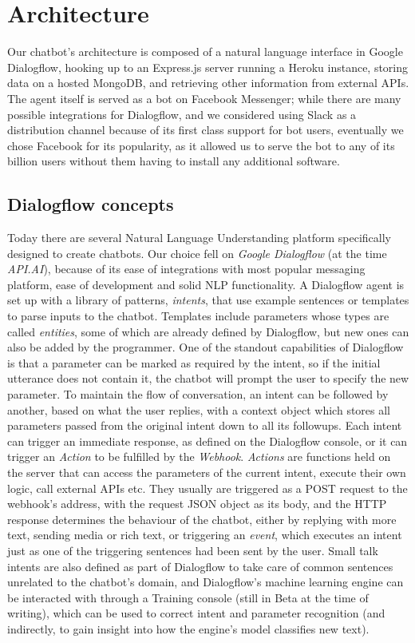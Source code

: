 \section{Architecture}
Our chatbot's architecture is composed of a natural language interface in Google Dialogflow, hooking up to an Express.js server running a Heroku instance, storing data on a hosted MongoDB, and retrieving other information from external APIs. The agent itself is served as a bot on Facebook Messenger; while there are many possible integrations for Dialogflow, and we considered using Slack as a distribution channel because of its first class support for bot users, eventually we chose Facebook for its popularity, as it allowed us to serve the bot to any of its billion users without them having to install any additional software.
\subsection{Dialogflow concepts}
Today there are several Natural Language Understanding platform specifically designed to create chatbots. Our choice fell on \textit{Google Dialogflow} (at the time \textit{API.AI}), because of its ease of integrations with most popular messaging platform, ease of development and solid NLP functionality. A Dialogflow agent is set up with a library of patterns, \textit{intents}, that use example sentences or templates to parse inputs to the chatbot. Templates include parameters whose types are called \textit{entities}, some of which are already defined by Dialogflow, but new ones can also be added by the programmer. One of the standout capabilities of Dialogflow is that a parameter can be marked as required by the intent, so if the initial utterance does not contain it, the chatbot will prompt the user to specify the new parameter. To maintain the flow of conversation, an intent can be followed by another, based on what the user replies, with a context object which stores all parameters passed from the original intent down to all its followups. Each intent can trigger an immediate response, as defined on the Dialogflow console, or it can trigger an \textit{Action} to be fulfilled by the \textit{Webhook}. \textit{Actions} are functions held on the server that can access the parameters of the current intent, execute their own logic, call external APIs etc. They usually are triggered as a POST request to the webhook's address, with the request JSON object as its body, and the HTTP response determines the behaviour of the chatbot, either by replying with more text, sending media or rich text, or triggering an \textit{event}, which executes an intent just as one of the triggering sentences had been sent by the user. Small talk intents are also defined as part of Dialogflow to take care of common sentences unrelated to the chatbot's domain, and Dialogflow's machine learning engine can be interacted with through a Training console (still in Beta at the time of writing), which can be used to correct intent and parameter recognition (and indirectly, to gain insight into how the engine's model classifies new text).

